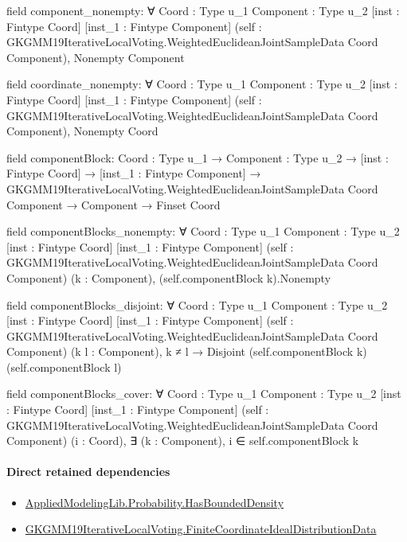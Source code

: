 \documentclass[10pt]{article}
\begin{document}
\begin{ReviewVerbatim}
field component_nonempty:
∀ {Coord : Type u_1} {Component : Type u_2} [inst : Fintype Coord] [inst_1 : Fintype Component]
  (self : GKGMM19IterativeLocalVoting.WeightedEuclideanJointSampleData Coord Component), Nonempty Component

field coordinate_nonempty:
∀ {Coord : Type u_1} {Component : Type u_2} [inst : Fintype Coord] [inst_1 : Fintype Component]
  (self : GKGMM19IterativeLocalVoting.WeightedEuclideanJointSampleData Coord Component), Nonempty Coord

field componentBlock:
{Coord : Type u_1} →
  {Component : Type u_2} →
    [inst : Fintype Coord] →
      [inst_1 : Fintype Component] →
        GKGMM19IterativeLocalVoting.WeightedEuclideanJointSampleData Coord Component → Component → Finset Coord

field componentBlocks_nonempty:
∀ {Coord : Type u_1} {Component : Type u_2} [inst : Fintype Coord] [inst_1 : Fintype Component]
  (self : GKGMM19IterativeLocalVoting.WeightedEuclideanJointSampleData Coord Component) (k : Component),
  (self.componentBlock k).Nonempty

field componentBlocks_disjoint:
∀ {Coord : Type u_1} {Component : Type u_2} [inst : Fintype Coord] [inst_1 : Fintype Component]
  (self : GKGMM19IterativeLocalVoting.WeightedEuclideanJointSampleData Coord Component) (k l : Component),
  k ≠ l → Disjoint (self.componentBlock k) (self.componentBlock l)

field componentBlocks_cover:
∀ {Coord : Type u_1} {Component : Type u_2} [inst : Fintype Coord] [inst_1 : Fintype Component]
  (self : GKGMM19IterativeLocalVoting.WeightedEuclideanJointSampleData Coord Component) (i : Coord),
  ∃ (k : Component), i ∈ self.componentBlock k
\end{ReviewVerbatim}

\paragraph{Direct retained dependencies}
\begin{itemize}\raggedright
\item \hyperlink{governing-declaration-9ebe5790e9384e80}{Applied\allowbreak{}Modeling\allowbreak{}Lib.\allowbreak{}Probability.\allowbreak{}Has\allowbreak{}Bounded\allowbreak{}Density}
\item \hyperlink{governing-declaration-57171116eb928bf6}{GKGMM19\allowbreak{}Iterative\allowbreak{}Local\allowbreak{}Voting.\allowbreak{}Finite\allowbreak{}Coordinate\allowbreak{}Ideal\allowbreak{}Distribution\allowbreak{}Data}
\end{itemize}
\hypertarget{governing-declaration-0b3dd9036d7079b2}{}
\end{document}
